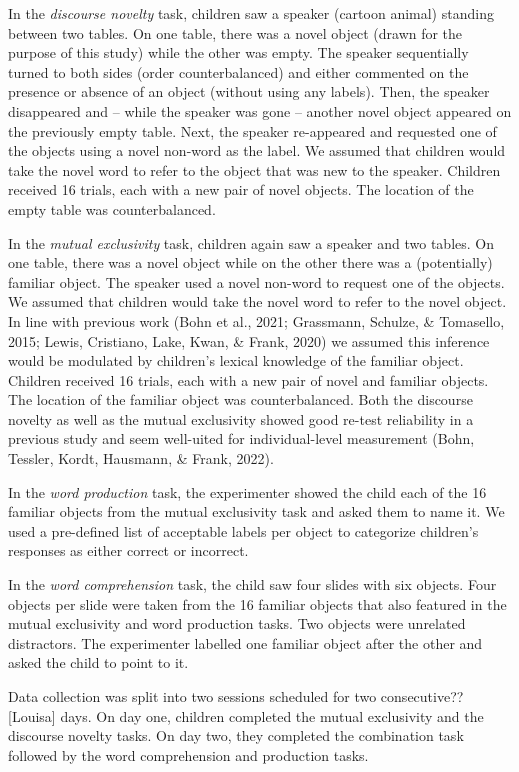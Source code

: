 \documentclass[
  man,floatsintext]{apa6}
\begin{document}
In the \emph{discourse novelty} task, children saw a speaker (cartoon animal) standing between two tables. On one table, there was a novel object (drawn for the purpose of this study) while the other was empty. The speaker sequentially turned to both sides (order counterbalanced) and either commented on the presence or absence of an object (without using any labels). Then, the speaker disappeared and -- while the speaker was gone -- another novel object appeared on the previously empty table. Next, the speaker re-appeared and requested one of the objects using a novel non-word as the label. We assumed that children would take the novel word to refer to the object that was new to the speaker. Children received 16 trials, each with a new pair of novel objects. The location of the empty table was counterbalanced.

In the \emph{mutual exclusivity} task, children again saw a speaker and two tables. On one table, there was a novel object while on the other there was a (potentially) familiar object. The speaker used a novel non-word to request one of the objects. We assumed that children would take the novel word to refer to the novel object. In line with previous work (Bohn et al., 2021; Grassmann, Schulze, \& Tomasello, 2015; Lewis, Cristiano, Lake, Kwan, \& Frank, 2020) we assumed this inference would be modulated by children's lexical knowledge of the familiar object. Children received 16 trials, each with a new pair of novel and familiar objects. The location of the familiar object was counterbalanced. Both the discourse novelty as well as the mutual exclusivity showed good re-test reliability in a previous study and seem well-uited for individual-level measurement (Bohn, Tessler, Kordt, Hausmann, \& Frank, 2022).

In the \emph{word production} task, the experimenter showed the child each of the 16 familiar objects from the mutual exclusivity task and asked them to name it. We used a pre-defined list of acceptable labels per object to categorize children's responses as either correct or incorrect.

In the \emph{word comprehension} task, the child saw four slides with six objects. Four objects per slide were taken from the 16 familiar objects that also featured in the mutual exclusivity and word production tasks. Two objects were unrelated distractors. The experimenter labelled one familiar object after the other and asked the child to point to it.

Data collection was split into two sessions scheduled for two consecutive?? {[}Louisa{]} days. On day one, children completed the mutual exclusivity and the discourse novelty tasks. On day two, they completed the combination task followed by the word comprehension and production tasks.
\end{document}
